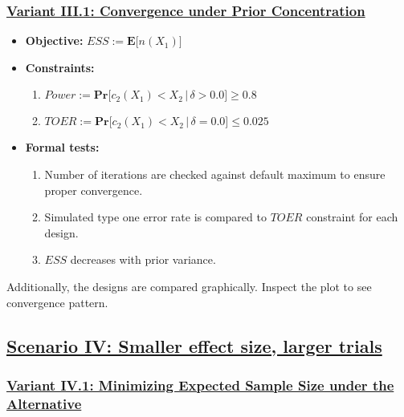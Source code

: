 \documentclass[]{book}
\providecommand{\tightlist}{%
  \setlength{\itemsep}{0pt}\setlength{\parskip}{0pt}}
\begin{document}
\hypertarget{variant-iii.1-convergence-under-prior-concentration}{%
\subsubsection{\texorpdfstring{\protect\hyperlink{variantIII_1}{Variant III.1: Convergence under Prior Concentration}}{Variant III.1: Convergence under Prior Concentration}}\label{variant-iii.1-convergence-under-prior-concentration}}

\begin{itemize}
\tightlist
\item
  \textbf{Objective:} \(ESS := \boldsymbol{E}\big[n(X_1)\big]\)
\item
  \textbf{Constraints:}

  \begin{enumerate}
  \def\labelenumi{\arabic{enumi}.}
  \tightlist
  \item
    \(Power := \boldsymbol{Pr}\big[c_2(X_1) < X_2\,|\,\delta>0.0\big] \geq 0.8\)
  \item
    \(TOER := \boldsymbol{Pr}\big[c_2(X_1) < X_2\,|\,\delta=0.0\big] \leq 0.025\)
  \end{enumerate}
\item
  \textbf{Formal tests:}

  \begin{enumerate}
  \def\labelenumi{\arabic{enumi}.}
  \tightlist
  \item
    Number of iterations are checked against default maximum to ensure proper
    convergence.
  \item
    Simulated type one error rate is compared to \(TOER\) constraint for each
    design.
  \item
    \(ESS\) decreases with prior variance.
  \end{enumerate}
\end{itemize}

Additionally, the designs are compared graphically.
Inspect the plot to see convergence pattern.

\hypertarget{scenario-iv-smaller-effect-size-larger-trials}{%
\subsection{\texorpdfstring{\protect\hyperlink{scenarioIV}{Scenario IV: Smaller effect size, larger trials}}{Scenario IV: Smaller effect size, larger trials}}\label{scenario-iv-smaller-effect-size-larger-trials}}

\hypertarget{variant-iv.1-minimizing-expected-sample-size-under-the-alternative}{%
\subsubsection{\texorpdfstring{\protect\hyperlink{variantIV_1}{Variant IV.1: Minimizing Expected Sample Size under the Alternative}}{Variant IV.1: Minimizing Expected Sample Size under the Alternative}}\label{variant-iv.1-minimizing-expected-sample-size-under-the-alternative}}
\end{document}
